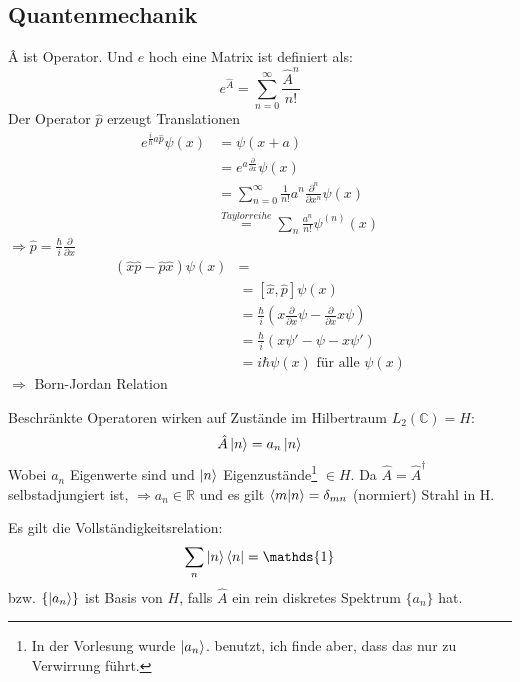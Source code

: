 	\subsection{Quantenmechanik}
		\^{A} ist Operator. Und $e$ hoch eine Matrix ist definiert als:
			\begin{equation*}
				e^{\hat{A}}= \sum_{n=0}^{\infty} \frac{\hat{A}^n}{n!}
			\end{equation*}
		Der Operator $\hat{p}$ erzeugt Translationen
			\begin{align*}
				e^{\frac{i}{\hbar} a \hat{p}} \psi(x) &= 
				\psi(x+a) \\
				&= e^{a \frac{\partial}{\partial x}} \psi(x) \\
				&= \sum_{n=0}^{\infty} \frac{1}{n!} a^n \frac{\partial^n}{\partial x^n} \psi(x) \\
				& \overset{Taylorreihe}{=} 
				\sum_{n} \frac{a^n}{n!} \psi^{(n)}(x)				
			\end{align*}
		$\Rightarrow \hat{p} = \frac{\hbar}{i} \frac{\partial}{\partial x}$
			\begin{align*}
				(\hat{x} \hat{p} - \hat{p} \hat{x}) \psi(x) &= \\
				&= [\hat{x}, \hat{p}] \psi(x) \\
				&= \frac{\hbar}{i} 
				\left( x \frac{\partial}{\partial x} \psi 
				- \frac{\partial}{\partial x} x \psi
				\right) \\
				&=\frac{\hbar}{i} \left( x \psi' - \psi - x\psi' \right) \\
				&=i \hbar \psi(x) \text{~für alle~} \psi (x)
			\end{align*}
		$ \Rightarrow$  \hspace{0.6cm} Born-Jordan Relation
		
		Beschränkte Operatoren wirken auf Zustände im Hilbertraum $L_2(\mathds{C}) = H$:
			\begin{equation*}
				\hat{A} \ket{n} = a_n \ket{n} 
			\end{equation*}
		Wobei $a_n$ Eigenwerte sind und $\ket{n}$ Eigenzustände\footnote{In der Vorlesung wurde $\ket{a_n}$. benutzt, ich finde aber, dass das nur zu Verwirrung führt.} $\in H$.
		Da $\hat{A} = \hat{A}^\dagger$ selbstadjungiert ist, $\Rightarrow a_n \in \mathds{R}$ und es gilt $\braket{m | n} = \delta_{mn}$ (normiert) \grqq Strahl in H\grqq.
		
		Es gilt die Vollständigkeitsrelation:
			\begin{equation*}
				\sum_n \ket{n} \bra{n} = \mathds{1}
			\end{equation*}
		bzw. $\{ \ket{a_n} \}$ ist Basis von $H$, falls $\hat{A}$ ein rein diskretes Spektrum $\{a_n\}$ hat. 
		
